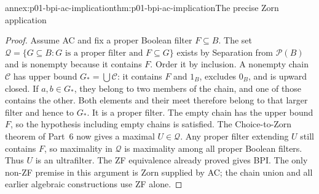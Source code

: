 \begin{annexitem}{annex:p01-bpi-ac-implication}{thm:p01-bpi-ac-implication}{The precise Zorn application}
\begin{proof}
Assume AC and fix a proper Boolean filter \(F\subseteq B\).
The set
\(\mathcal Q=\{G\subseteq B:G\text{ is a proper filter and }F\subseteq G\}\)
exists by Separation from \(\mathcal P(B)\) and is nonempty because it
contains \(F\). Order it by inclusion. A nonempty chain
\(\mathcal C\) has upper bound \(G_*=\bigcup\mathcal C\): it
contains \(F\) and \(1_B\), excludes \(0_B\), and is upward closed.
If \(a,b\in G_*\), they belong to two members of the chain, and
one of those contains the other. Both elements and their meet therefore
belong to that larger filter and hence to \(G_*\). It is a proper
filter. The empty chain has the upper bound \(F\), so the hypothesis
including empty chains is satisfied. The Choice-to-Zorn theorem of Part~6
now gives a maximal \(U\in\mathcal Q\). Any proper filter extending
\(U\) still contains \(F\), so maximality in \(\mathcal Q\)
is maximality among all proper Boolean filters. Thus \(U\) is an
ultrafilter. The ZF equivalence already proved gives BPI.
The only non-ZF premise in this argument is Zorn supplied by AC; the
chain union and all earlier algebraic constructions use ZF alone.
\end{proof}
\end{annexitem}

